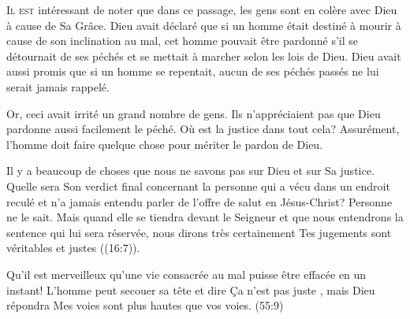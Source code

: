 \dvrule






\lettrine{I}{l est} intéressant de noter que dans ce passage,
 les gens sont en colère avec Dieu à cause de Sa Grâce.
 Dieu avait déclaré que si un homme était destiné à mourir
 à cause de son inclination au mal, cet homme pouvait être pardonné
 s'il se détournait de ses péchés et se mettait à marcher
 selon les lois de Dieu. Dieu avait aussi promis que si un homme se repentait,
 aucun de ses péchés passés ne lui serait jamais rappelé. 

Or, ceci avait irrité un grand nombre de gens. Ils n'appréciaient pas que Dieu
 pardonne aussi facilement le péché. Où est la justice dans tout cela?
 Assurément, l'homme doit faire quelque chose pour mériter le pardon de Dieu. 

Il y a beaucoup de choses que nous ne savons pas sur Dieu et sur Sa justice.
 Quelle sera Son verdict final concernant la personne qui a vécu
 dans un endroit reculé et n'a jamais entendu parler de l'offre de salut
 en Jésus-Christ? Personne ne le sait. Mais quand elle se tiendra
 devant le Seigneur et que nous entendrons la sentence qui lui sera réservée,
 nous dirons très certainement\frcolon{} 
 \Og Tes jugements sont véritables et justes \Fg{} ((16:7)). 



Qu'il est merveilleux qu'une vie consacrée au mal puisse être effacée
 en un instant! L'homme peut secouer sa tête et dire\frcolon{} 
 \Og Ça n'est pas juste \Fg{}, mais Dieu répondra\frcolon{} 
 \Og Mes voies sont plus hautes que vos voies. \Fg{}
 (55:9)

